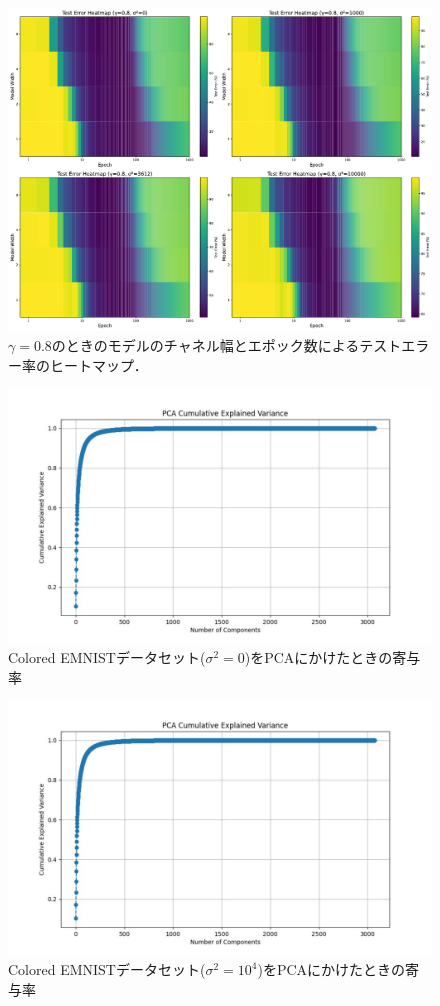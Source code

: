 \begin{figure}[H]
    \centering
    \includegraphics[width=\linewidth]{fig/heatmap_ln/ln0.8.pdf}
    \caption{$\gamma=0.8$のときのモデルのチャネル幅とエポック数によるテストエラー率のヒートマップ．}
    \label{fig:modelwidth_heatmap_0.8}
\end{figure}

\begin{figure}[H]
    \centering
    \includegraphics[width=\linewidth]{fig/kiyoritu_distribution_colored_EMNIST_Seed42_Var0_Corr0.5.pdf}
    \caption{Colored EMNISTデータセット($\sigma^2 = 0$)をPCAにかけたときの寄与率}
    \label{fig:modelwidth_heatmap_1}
\end{figure}

\begin{figure}[H]
    \centering
    \includegraphics[width=\linewidth]{fig/kiyoritu_distribution_colored_EMNIST_Seed42_Var10000_Corr0.5.pdf}
    \caption{Colored EMNISTデータセット($\sigma^2 = 10^4$)をPCAにかけたときの寄与率}
    \label{fig:modelwidth_heatmap_1}
\end{figure}
